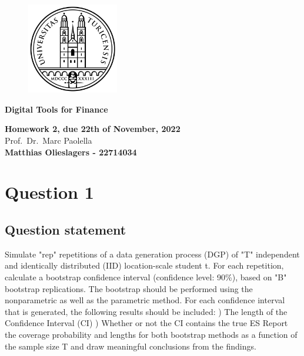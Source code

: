 \documentclass[12pt]{article}
\begin{document}
\pagestyle{empty}

\bigskip

\begin{figure}[htp]
    \centering
    \includegraphics[width=4cm]{uzh logo 2.png}
    \label{fig:UZH}
\end{figure}

\begin{Large}
	\begin{center}
		\textbf{Digital Tools for Finance}
	\end{center}
\end{Large}

\vspace{2cm}

\begin{large}	
	\begin{center}
		\textbf{Homework 2, due 22th of November, 2022} \vspace{0.1cm} \\ {Prof.\ Dr.\ Marc Paolella } \vspace{2cm} \\ \textbf{Matthias Olieslagers - 22714034} \vspace{2cm}
	\end{center}
\end{large}

\tableofcontents

\newpage

\bigskip
\section{Question 1}

\subsection*{Question statement}
Simulate "rep" repetitions of a data generation process (DGP) of "T" independent and identically distributed (IID) location-scale student t. For each repetition, calculate a bootstrap confidence interval (confidence level: 90\%), based on "B" bootstrap replications. The bootstrap should be performed using the nonparametric as well as the parametric method.
\newline \newline
For each confidence interval that is generated, the following results should be included:
) The length of the Confidence Interval (CI) ) Whether or not the CI contains the true ES \newline \newline
Report the coverage probability and lengths for both bootstrap methods as a function of the sample size T and draw meaningful conclusions from the findings.
\end{document}
